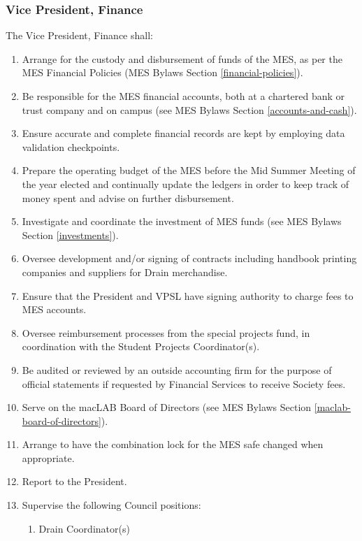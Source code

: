 \subsubsection{Vice President,
 Finance}
\label{vice-president-finance}
The Vice President, Finance shall:

\begin{enumerate}
 \item
  Arrange for the custody and disbursement of funds of the MES, as per the MES Financial Policies (MES Bylaws Section \ref{financial-policies}).
 \item
  Be responsible for the MES financial accounts, both at a chartered bank or trust company and on campus (see MES Bylaws Section \ref{accounts-and-cash}).
 \item
  Ensure accurate and complete financial records are kept by employing data validation checkpoints.
 \item
  Prepare the operating budget of the MES before the Mid Summer Meeting of the year elected and continually update the ledgers in order to keep track of money spent and advise on further disbursement.
 \item
  Investigate and coordinate the investment of MES funds (see MES Bylaws Section \ref{investments}).
 \item
  Oversee development and/or signing of contracts including handbook printing companies and suppliers for Drain merchandise.
 \item
  Ensure that the President and VPSL have signing authority to charge fees to MES accounts.
 \item
  Oversee reimbursement processes from the special projects fund, in coordination with the Student Projects Coordinator(s).
 \item
  Be audited or reviewed by an outside accounting firm for the purpose of official statements if requested by Financial Services to receive Society fees.
 \item
  Serve on the macLAB Board of Directors (see MES Bylaws Section \ref{maclab-board-of-directors}).
 \item
  Arrange to have the combination lock for the MES safe changed when appropriate.
 \item
  Report to the President.
 \item
  Supervise the following Council positions:

  \begin{enumerate}
   \item
    Drain Coordinator(s)

  \end{enumerate}
\end{enumerate}